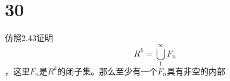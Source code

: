 \paragraph{}
\paragraph{}
\paragraph{}
\paragraph{}
\paragraph{}
\paragraph{}
\section*{30} 仿照2.43证明$$R^k = \bigcup_1^{\infty} F_n$$，这里$F_n$是$R^k$的闭子集。那么至少有一个$F_n$具有非空的内部
\paragraph{}
\paragraph{}
\paragraph{}
\paragraph{}
\paragraph{}
\paragraph{}
\paragraph{}
\paragraph{}
\paragraph{}
\paragraph{}
